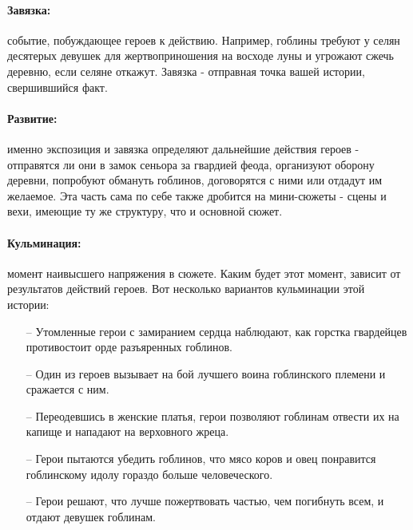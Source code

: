 \paragraph{Завязка:} событие, побуждающее героев к действию. Например, гоблины требуют у селян десятерых девушек для жертвоприношения на восходе луны и угрожают сжечь деревню, если селяне откажут. Завязка - отправная точка вашей истории, свершившийся факт.
\paragraph{Развитие:} именно экспозиция и завязка определяют дальнейшие действия героев - отправятся ли они в замок сеньора за гвардией феода, организуют оборону деревни, попробуют обмануть гоблинов, договорятся с ними или отдадут им желаемое. Эта часть сама по себе также дробится на мини-сюжеты - сцены и вехи, имеющие ту же структуру, что и основной сюжет.
\paragraph{Кульминация:} момент наивысшего напряжения в сюжете. Каким будет этот момент, зависит от результатов действий героев. Вот несколько вариантов кульминации этой истории:
\begin{itemize}
\item[--] Утомленные герои с замиранием сердца наблюдают, как горстка гвардейцев противостоит орде разъяренных гоблинов.
\item[--] Один из героев вызывает на бой лучшего воина гоблинского племени и сражается с ним.
\item[--] Переодевшись в женские платья, герои позволяют гоблинам отвести их на капище и нападают на верховного жреца.
\item[--] Герои пытаются убедить гоблинов, что мясо коров и овец понравится гоблинскому идолу гораздо больше человеческого.
\item[--] Герои решают, что лучше пожертвовать частью, чем погибнуть всем, и отдают девушек гоблинам.
\end{itemize}
